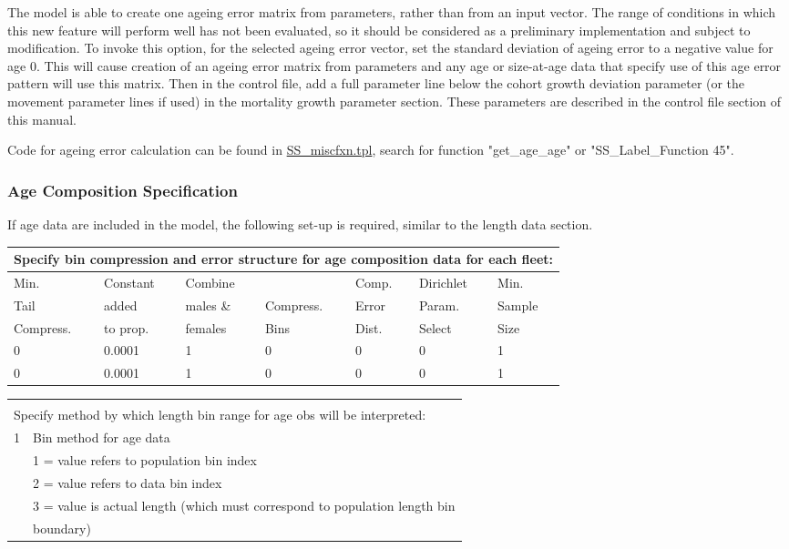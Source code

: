 The model is able to create one ageing error matrix from parameters, rather than from an input vector.  The range of conditions in which this new feature will perform well has not been evaluated, so it should be considered as a preliminary implementation and subject to modification. To invoke this option, for the selected ageing error vector, set the standard deviation of ageing error to a negative value for age 0.  This will cause creation of an ageing error matrix from parameters and any age or size-at-age data that specify use of this age error pattern will use this matrix. Then in the control file, add a full parameter line below the cohort growth deviation parameter (or the movement parameter lines if used) in the mortality growth parameter section.  These parameters are described in the control file section of this manual.

Code for ageing error calculation can be found in \href{https://github.com/nmfs-stock-synthesis/stock-synthesis/blob/main/SS_miscfxn.tpl}{SS\_miscfxn.tpl}, search for function "get\_age\_age" or "SS\_Label\_Function 45".

\subsubsection{Age Composition Specification}
If age data are included in the model, the following set-up is required, similar to the length data section.

\begin{tabular}{p{2cm} p{2cm} p{2cm} p{1.5cm} p{1.5cm} p{2cm} p{2cm}}
		\multicolumn{7}{l}{Specify bin compression and error structure for age composition data for each fleet:}\\
		\hline
		Min.      & Constant & Combine   &           & Comp. & Dirichlet & Min.\Tstrut\\
		Tail      & added    & males \&  & Compress. & Error & Param.    & Sample\\
		Compress. & to prop. & females   & Bins      & Dist. & Select    & Size\Bstrut\\
		\hline
		0 & 0.0001 & 1 & 0 & 0 & 0 & 1 \Tstrut\\
		0 & 0.0001 & 1 & 0 & 0 & 0 & 1 \Bstrut\\
		\hline
\end{tabular}

			
\begin{tabular}{p{1cm} p{14cm}}
	 & \\
	\multicolumn{2}{l}{Specify method by which length bin range for age obs will be interpreted:}\\
	\hline
	1 & Bin method for age data \Tstrut\\
	  & 1 = value refers to population bin index\\
	  & 2 = value refers to data bin index\\
	  & 3 = value is actual length (which must correspond to population length bin  \\
	  & boundary)\Bstrut\\
	 \hline
\end{tabular}


